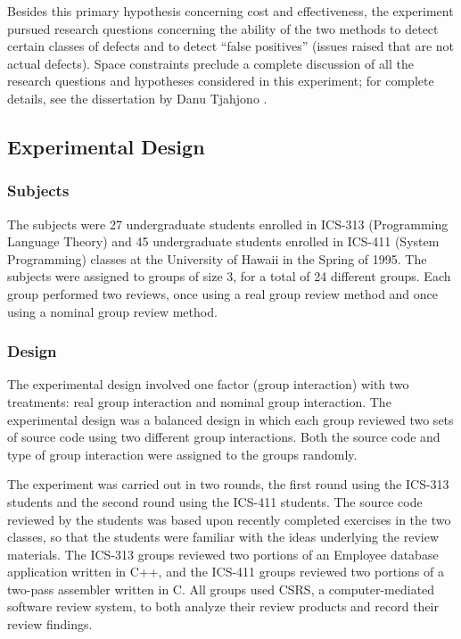 Besides this primary hypothesis concerning cost and effectiveness, the
experiment pursued research questions concerning the ability of the two
methods to detect certain classes of defects and to detect ``false
positives'' (issues raised that are not actual defects).  
Space constraints preclude a complete discussion
of all the research questions and hypotheses considered in this experiment;
for complete details, see the 
dissertation by Danu Tjahjono \cite{csdl-95-08}.


\subsection{Experimental Design}


\subsubsection{Subjects}

The subjects were 27 undergraduate students enrolled in ICS-313
(Programming Language Theory) and 45 undergraduate students enrolled in
ICS-411 (System Programming) classes at the University of Hawaii in the
Spring of 1995. The subjects were assigned to groups of size 3, for a total
of 24 different groups.  Each group performed two reviews, once using a
real group review method and once using a nominal group review method.


\subsubsection{Design}

The experimental design involved one factor (group interaction) with two
treatments: real group interaction and nominal group
interaction.  The experimental design was a  balanced design in
which each group reviewed two sets of source code using two different group
interactions. Both the source code and type of group interaction were assigned 
to the groups randomly.  

The experiment was carried out in two rounds, the first round using the
ICS-313 students and the second round using the ICS-411 students. The
source code reviewed by the students was based upon recently completed
exercises in the two classes, so that the students were familiar with
the ideas underlying the review materials. The ICS-313 groups reviewed two
portions of an Employee database application written in C++, and the
ICS-411 groups reviewed two portions of a two-pass assembler written in C.
All groups used CSRS, a computer-mediated software review system, to both
analyze their review products and record their review findings.

